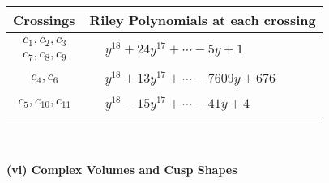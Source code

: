\documentclass[1p]{elsarticle_modified}
\theoremstyle{definition}
\begin{document}
\begin{tabular}{m{50pt}|m{274pt}}
Crossings & \hspace{64pt}Riley Polynomials at each crossing \\
\hline $$\begin{aligned}c_{1},c_{2},c_{3}\\c_{7},c_{8},c_{9}\end{aligned}$$&$\begin{aligned}
&y^{18}+24 y^{17}+\cdots-5 y+1
\end{aligned}$\\
\hline $$\begin{aligned}c_{4},c_{6}\end{aligned}$$&$\begin{aligned}
&y^{18}+13 y^{17}+\cdots-7609 y+676
\end{aligned}$\\
\hline $$\begin{aligned}c_{5},c_{10},c_{11}\end{aligned}$$&$\begin{aligned}
&y^{18}-15 y^{17}+\cdots-41 y+4
\end{aligned}$\\
\hline
\end{tabular}\\~\\
\newpage\flushleft \textbf{(vi) Complex Volumes and Cusp Shapes}
\end{document}
